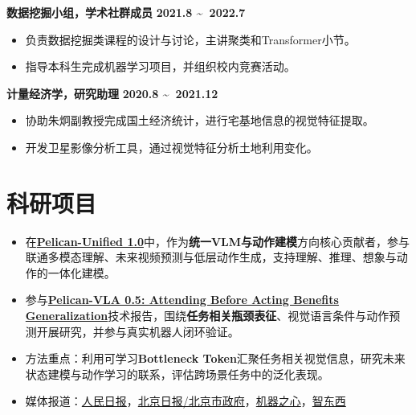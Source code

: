 \documentclass{resume}
\begin{document}
\begin{flushleft}
\textbf{\fangsong 数据挖掘小组，学术社群成员} \hfill \textbf{2021.8 \textasciitilde \ 2022.7}
\end{flushleft}
\begin{itemize}
    \item \kaishu 负责数据挖掘类课程的设计与讨论，主讲聚类和Transformer小节。
    \item \kaishu 指导本科生完成机器学习项目，并组织校内竞赛活动。
\end{itemize}

\begin{flushleft}
\textbf{\fangsong 计量经济学，研究助理} \hfill \textbf{2020.8 \textasciitilde \ 2021.12}
\end{flushleft}
\begin{itemize}
    \item \kaishu 协助朱炯副教授完成国土经济统计，进行宅基地信息的视觉特征提取。
    \item \kaishu 开发卫星影像分析工具，通过视觉特征分析土地利用变化。
\end{itemize}
\section{\makebox[.75em][c]{\faFlask} \textbf{\fangsong 科研项目}}
\begin{itemize}
    \item \kaishu 在\href{https://arxiv.org/abs/2605.15153}{\textbf{Pelican-Unified 1.0}}中，作为\textbf{统一VLM与动作建模}方向核心贡献者，参与联通多模态理解、未来视频预测与低层动作生成，支持理解、推理、想象与动作的一体化建模。
    \item \kaishu 参与\href{https://arxiv.org/abs/2607.06655}{\textbf{Pelican-VLA 0.5: Attending Before Acting Benefits Generalization}}技术报告，围绕\textbf{任务相关瓶颈表征}、视觉语言条件与动作预测开展研究，并参与真实机器人闭环验证。
    \item \kaishu 方法重点：利用可学习\textbf{Bottleneck Token}汇聚任务相关视觉信息，研究未来状态建模与动作学习的联系，评估跨场景任务中的泛化表现。
    \item \kaishu 媒体报道：\href{https://www.peopleapp.com/column/30052155186-500007497131}{人民日报}，\href{https://www.beijing.gov.cn/fuwu/lqfw/gggs/202605/t20260519_4656998.html}{北京日报/北京市政府}，\href{https://mp.weixin.qq.com/s/z-OAqnl4IKHpaiT4bYBHIA}{机器之心}，\href{https://www.zhidx.com/p/558258.html}{智东西}
\end{itemize}
\end{document}
